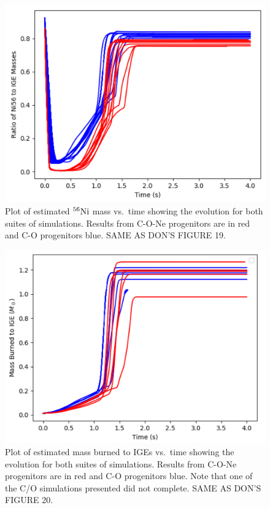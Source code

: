 \documentclass[iop,apj]{emulateapj}
\newcommand{\Ni}[1]{\ensuremath{{}^{#1}{\rm Ni}}}
\begin{document}
\begin{figure}
\includegraphics[width=\columnwidth]{figures/compare_ratio_v2.png}
\caption{\label{fig:compare_ratio}
Plot of estimated \Ni{56} mass vs.\ time showing the evolution
for both suites of simulations. Results from 
C-O-Ne progenitors are in red and C-O progenitors blue. 
{\color{red} SAME AS DON'S FIGURE 19}.
}
\end{figure}
\begin{figure}
\includegraphics[width=\columnwidth]{figures/compare_burned_mass_v2.png}
\caption{\label{fig:compare_burned}
Plot of estimated mass burned to IGEs vs.\ time showing the evolution
for both suites of simulations. Results from C-O-Ne progenitors are 
in red and C-O progenitors blue.  
Note that one of the C/O simulations presented did not complete.
{\color{red} SAME AS DON'S FIGURE 20.} 
}
\end{figure}
\end{document}
